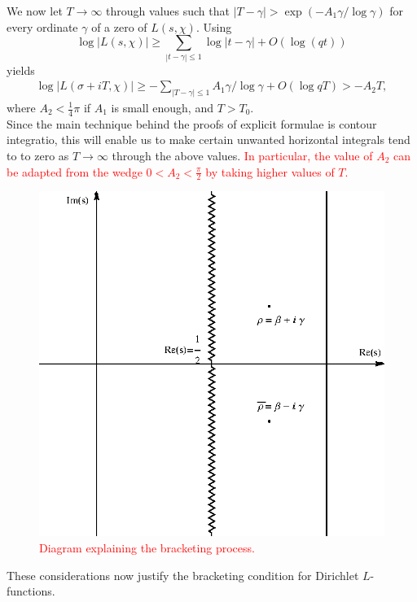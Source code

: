 \documentclass[11pt]{article}
\numberwithin{equation}{section}		 			%
\numberwithin{figure}{section}			 			%
\begin{document}
\noindent We now let $T \to \infty$ through values such that $\left| {T - \gamma } \right| > \exp ( - {A_1}\gamma /\log \gamma )$ for every ordinate $\gamma$ of a zero of $L(s,\chi)$. Using
\[\log\left| {L(s,\chi )} \right| \geqslant \sum\limits_{\left| {t - \gamma } \right| \leqslant 1} {\log \left| {t - \gamma } \right|}  + O(\log (qt))\]
yields
\begin{align} \label{angleLfunction}
\log \left| {L(\sigma  + iT,\chi )} \right| \geqslant  - \sum\limits_{\left| {T - \gamma } \right| \leqslant 1} {{A_1}\gamma /\log \gamma }  + O(\log qT) >  - {A_2}T,
\end{align}
where $A_2 < \tfrac{1}{4}\pi$ if $A_1$ is small enough, and $T >T_0$.\\
Since the main technique behind the proofs of explicit formulae is contour integratio, this will enable us to make certain unwanted horizontal integrals tend to to zero as $T \to \infty$ through the above values. \textcolor{red}{In particular, the value of $A_2$ can be adapted from the wedge $0 < A_2 < \tfrac{\pi}{2}$ by taking higher values of $T$.}
\begin{figure}[H]
	\centering
		\includegraphics{ContoursPlots_gr2.eps}
	\caption{\textcolor{red}{Diagram explaining the bracketing process.}}
\end{figure}
\noindent These considerations now justify the bracketing condition for Dirichlet $L$-functions.
\end{document}

